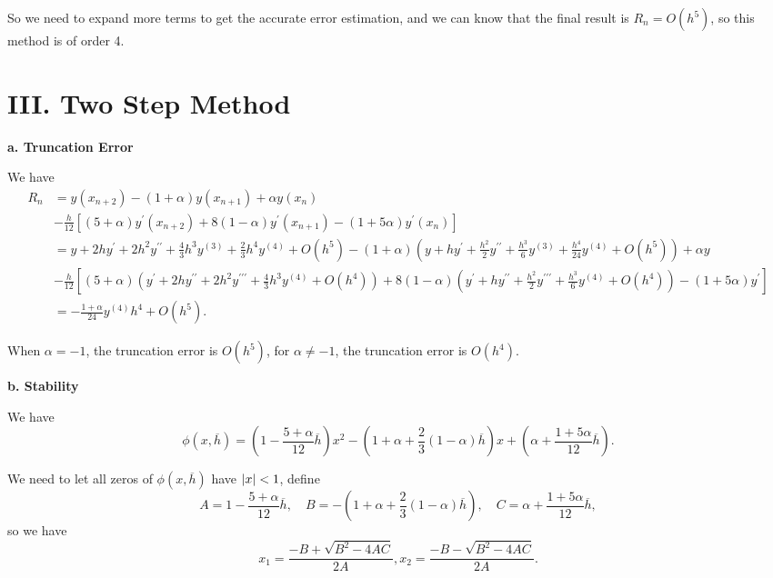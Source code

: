 \documentclass[a4paper]{article}
\begin{document}
So we need to expand more terms to get the accurate error estimation, and we can know that the final result is $R_n = O(h^5)$, so this method is of order 4.


\section*{III. Two Step Method}

\textbf{a. Truncation Error}

We have 
\begin{equation}
    \begin{aligned}
        R_n &= y(x_{n+2}) - (1+\alpha) y(x_{n+1}) + \alpha y(x_n) \\
        &- \frac{h}{12} [(5+\alpha) y^{\prime}(x_{n+2}) + 8(1-\alpha) y^{\prime}(x_{n+1}) - (1+5\alpha) y^{\prime}(x_n)] \\
        &= y + 2h y^{\prime} + 2h^2 y^{\prime \prime} + \frac{4}{3} h^3 y^{(3)} + \frac{2}{3} h^4 y^{(4)} + O(h^5) - (1+\alpha) (y + h y^{\prime} + \frac{h^2}{2} y^{\prime \prime} + \frac{h^3}{6} y^{(3)} + \frac{h^4}{24} y^{(4)} + O(h^5)) + \alpha y \\
        &- \frac{h}{12} [(5 + \alpha) (y^{\prime} + 2h y^{\prime \prime} + 2h^2 y^{\prime \prime \prime} + \frac{4}{3} h^3 y^{(4)} + O(h^4)) + 8(1-\alpha) (y^{\prime} + h y^{\prime \prime} + \frac{h^2}{2} y^{\prime \prime \prime} + \frac{h^3}{6} y^{(4)} + O(h^4)) - (1+5\alpha) y^{\prime}] \\
        &= -\frac{1+\alpha}{24} y^{(4)} h^4 + O(h^5).
    \end{aligned}
\end{equation}

When $\alpha = -1$, the truncation error is $O(h^5)$, for $\alpha \ne -1$, the truncation error is $O(h^4)$.

\textbf{b. Stability}

We have 
\begin{equation}
    \phi(x, \overline{h}) = (1 - \frac{5+\alpha}{12}\overline{h}) x^2 - (1+\alpha + \frac{2}{3}(1-\alpha)\overline{h}) x + (\alpha + \frac{1+5\alpha}{12}\overline{h}).
\end{equation}

We need to let all zeros of $\phi(x, \overline{h})$ have $\abs{x} < 1$, define 
\[A = 1 - \frac{5+\alpha}{12}\overline{h},\quad B = -(1+\alpha + \frac{2}{3}(1-\alpha)\overline{h}),\quad C= \alpha + \frac{1+5\alpha}{12}\overline{h},\]
so we have 
\begin{equation}
    x_1 = \frac{-B + \sqrt{B^2 - 4AC}}{2A}, x_2 = \frac{-B - \sqrt{B^2 - 4AC}}{2A}.
\end{equation}
\end{document}
